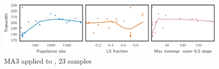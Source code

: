 \begin{figure}[h]\strictpagecheck\centering

\includegraphics[scale=0.85]{plots/MA3-correlation-regplots-school1-0-crop.pdf}


\caption[Parameter influence for MA3 when applied to ]{\gls{MA3} applied to , 23 samples}

\label{MA3-correlation-regplots-school1}

\end{figure}